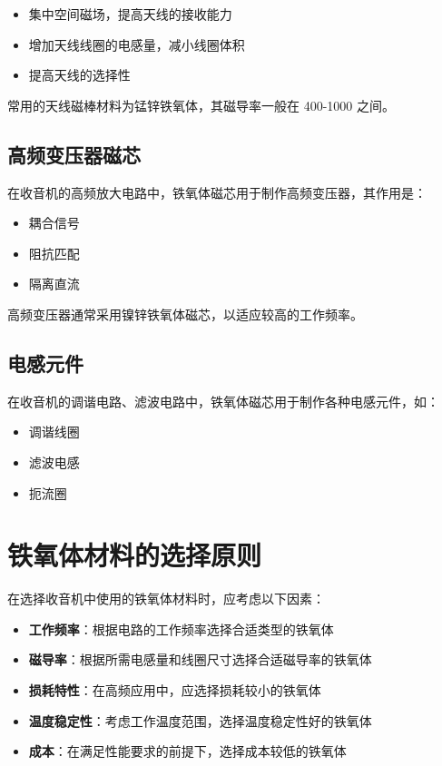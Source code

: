 \documentclass[12pt,UTF8]{ctexbook}
\begin{document}
\begin{itemize}[leftmargin=2cm]
    \item 集中空间磁场，提高天线的接收能力
    \item 增加天线线圈的电感量，减小线圈体积
    \item 提高天线的选择性
\end{itemize}

常用的天线磁棒材料为锰锌铁氧体，其磁导率一般在 400-1000 之间。

\subsection{高频变压器磁芯}

在收音机的高频放大电路中，铁氧体磁芯用于制作高频变压器，其作用是：

\begin{itemize}[leftmargin=2cm]
    \item 耦合信号
    \item 阻抗匹配
    \item 隔离直流
\end{itemize}

高频变压器通常采用镍锌铁氧体磁芯，以适应较高的工作频率。

\subsection{电感元件}

在收音机的调谐电路、滤波电路中，铁氧体磁芯用于制作各种电感元件，如：

\begin{itemize}[leftmargin=2cm]
    \item 调谐线圈
    \item 滤波电感
    \item 扼流圈
\end{itemize}

\section{铁氧体材料的选择原则}

在选择收音机中使用的铁氧体材料时，应考虑以下因素：

\begin{itemize}[leftmargin=2cm]
    \item \textbf{工作频率}：根据电路的工作频率选择合适类型的铁氧体
    \item \textbf{磁导率}：根据所需电感量和线圈尺寸选择合适磁导率的铁氧体
    \item \textbf{损耗特性}：在高频应用中，应选择损耗较小的铁氧体
    \item \textbf{温度稳定性}：考虑工作温度范围，选择温度稳定性好的铁氧体
    \item \textbf{成本}：在满足性能要求的前提下，选择成本较低的铁氧体
\end{itemize}
\end{document}
